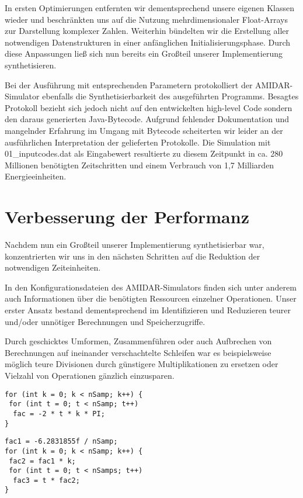 \documentclass[parskip,
							 oneside,
							 11pt,
							 noheadingspace,
							 accentcolor=tud1d,
							 bigchapter,
							 colorback]{tudreport}
\begin{document}
In ersten Optimierungen entfernten wir dementsprechend unsere eigenen Klassen wieder und beschränkten uns auf die Nutzung mehrdimensionaler Float-Arrays zur Darstellung komplexer Zahlen. Weiterhin bündelten wir die Erstellung aller notwendigen Datenstrukturen in einer anfänglichen Initialisierungsphase. Durch diese Anpassungen ließ sich nun bereits ein Großteil unserer Implementierung synthetisieren. 

Bei der Ausführung mit entsprechenden Parametern protokolliert der AMIDAR-Simulator ebenfalls die Synthetisierbarkeit des ausgeführten Programms. Besagtes Protokoll bezieht sich jedoch nicht auf den entwickelten high-level Code sondern den daraus generierten Java-Bytecode. Aufgrund fehlender Dokumentation und mangelnder Erfahrung im Umgang mit Bytecode scheiterten wir leider an der ausführlichen Interpretation der gelieferten Protokolle. Die Simulation mit 01\_inputcodes.dat als Eingabewert resultierte zu diesem Zeitpunkt in ca. 280 Millionen benötigten Zeitschritten und einem Verbrauch von 1,7 Milliarden Energieeinheiten.

\section{Verbesserung der Performanz}
Nachdem nun ein Großteil unserer Implementierung synthetisierbar war, konzentrierten wir uns in den nächsten Schritten auf die Reduktion der notwendigen Zeiteinheiten. 

In den Konfigurationsdateien des AMIDAR-Simulators finden sich unter anderem auch Informationen über die benötigten Ressourcen einzelner Operationen. Unser erster Ansatz bestand dementsprechend im Identifizieren und Reduzieren teurer und/oder unnötiger Berechnungen und Speicherzugriffe.

Durch geschicktes Umformen, Zusammenführen oder auch Aufbrechen von Berechnungen auf ineinander verschachtelte Schleifen war es beispielsweise möglich teure Divisionen durch günstigere Multiplikationen zu ersetzen oder Vielzahl von Operationen gänzlich einzusparen.


\noindent
\begin{minipage}[t]{.49\textwidth}
\hspace*{0pt}
\begin{lstlisting}[basicstyle=\small, caption = Ohne Umformungen]
for (int k = 0; k < nSamp; k++) { 
 for (int t = 0; t < nSamp; t++) 
  fac = -2 * t * k * PI;
}
\end{lstlisting}
\end{minipage}
\hfill
\begin{minipage}[t]{.49\textwidth}
\hspace*{0pt}
\begin{lstlisting}[basicstyle=\small, caption= Optimierte Berechnungen]
fac1 = -6.2831855f / nSamp;
for (int k = 0; k < nSamp; k++) { 
 fac2 = fac1 * k; 
 for (int t = 0; t < nSamps; t++) 
  fac3 = t * fac2;
}
\end{lstlisting}
\end{minipage}
\end{document}
